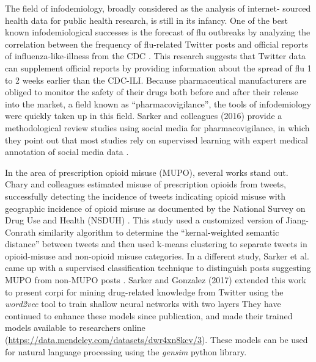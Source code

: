 \documentclass[sigconf]{acmart}
\begin{document}
The field of infodemiology, broadly considered as the analysis of internet-
sourced health data for public health research, is still in its infancy. One 
of the best known infodemiological successes is the forecast of flu outbreaks 
by analyzing the correlation between the frequency of flu-related Twitter posts 
and official reports of influenza-like-illness from the CDC \cite{culotta10, 
paul14}. This research suggests that Twitter data can supplement official 
reports by providing information about the spread of flu 1 to 2 weeks earlier 
than the CDC-ILI. Because pharmaceutical manufacturers are obliged to monitor 
the safety of their drugs both before and after their release into the market,
a field known as ``pharmacovigilance'', the tools of infodemiology were quickly 
taken up in this field. Sarker and colleagues (2016) provide a methodological 
review studies using social media for pharmacovigilance, in which they point 
out that most studies rely on supervised learning with expert medical annotation 
of social media data \cite{sarker16}. 

In the area of prescription opioid misuse (MUPO), several works stand out. 
Chary and colleagues estimated misuse of prescription opioids from tweets, 
successfully detecting the incidence of tweets indicating opioid misuse with 
geographic incidence of opioid misuse as documented by the National Survey 
on Drug Use and Health (NSDUH) \cite{chary17}. This study used a customized 
version of Jiang-Conrath similarity algorithm \cite{jiang97} to determine the 
``kernal-weighted semantic distance'' between tweets and then used k-means 
clustering to separate tweets in opioid-misuse and non-opioid misuse 
categories. In a different study, Sarker et al. came up with a supervised 
classification technique to distinguish posts suggesting MUPO from non-MUPO 
posts \cite{sarker15}. Sarker and Gonzalez (2017) extended this work to present 
corpi for mining drug-related knowledge from Twitter using the \emph{word2vec} 
tool to train shallow neural networks with two layers \cite{sarker17} They have 
continued to enhance these models since publication, and made their trained 
models available to researchers online 
(\url{https://data.mendeley.com/datasets/dwr4xn8kcv/3}). 
These models can be used for natural language processing using the 
\emph{gensim} python library.

\end{document}
